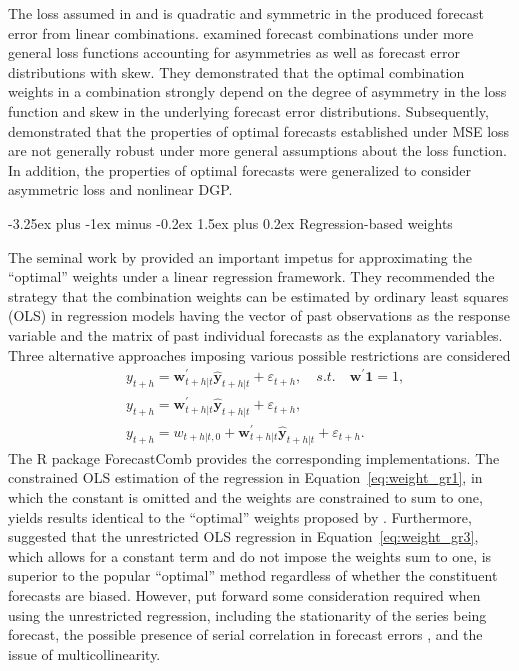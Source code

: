\documentclass[11pt]{article}
\makeatletter
\newcommand{\pkg}[1]{{\normalfont\fontseries{b}\selectfont #1}}
\let\proglang=\textsf
\renewcommand{\paragraph}{\@startsection{paragraph}{4}{0ex}%
   {-3.25ex plus -1ex minus -0.2ex}%
   {1.5ex plus 0.2ex}%
   {\normalfont\normalsize\bfseries}}
\makeatother
\begin{document}
The loss assumed in \citet{Bates1969-yj} and \citet{Newbold1974-lp} is quadratic and symmetric in the produced forecast error from linear combinations. \citet{Elliott2004-dz} examined forecast combinations under more general loss functions accounting for asymmetries as well as forecast error distributions with skew. They demonstrated that the optimal combination weights in a combination strongly depend on the degree of asymmetry in the loss function and skew in the underlying forecast error distributions. Subsequently, \citet{Patton2007-zo} demonstrated that the properties of optimal forecasts established under MSE loss are not generally robust under more general assumptions about the loss function. In addition, the properties of optimal forecasts were generalized to consider asymmetric loss and nonlinear DGP.

\paragraph{Regression-based weights}

The seminal work by \citet{Granger1984-jc} provided an important impetus for approximating the ``optimal'' weights under a linear regression framework. They recommended the strategy that the combination weights can be estimated by ordinary least squares (OLS) in regression models having the vector of past observations as the response variable and the matrix of past individual forecasts as the explanatory variables. Three alternative approaches imposing various possible restrictions are considered
\begin{align}
&y_{t+h}=\boldsymbol{w}_{t+h|t}^{\prime} \hat{\boldsymbol{y}}_{t+h|t}+\varepsilon_{t+h}, \quad s.t. \quad \boldsymbol{w}^{\prime}\boldsymbol{1}=1, \label{eq:weight_gr1}\\
&y_{t+h}=\boldsymbol{w}^{\prime}_{t+h|t} \hat{\boldsymbol{y}}_{t+h|t}+\varepsilon_{t+h}, \nonumber\\
&y_{t+h}=w_{t+h|t, 0}+\boldsymbol{w}_{t+h|t}^{\prime} \hat{\boldsymbol{y}}_{t+h|t}+\varepsilon_{t+h}. \label{eq:weight_gr3}
\end{align}
The \proglang{R} package \pkg{ForecastComb} provides the corresponding implementations. The constrained OLS estimation of the regression in Equation~\eqref{eq:weight_gr1}, in which the constant is omitted and the weights are constrained to sum to one, yields results identical to the ``optimal'' weights proposed by \citet{Bates1969-yj}. Furthermore, \citet{Granger1984-jc} suggested that the unrestricted OLS regression in Equation~\eqref{eq:weight_gr3}, which allows for a constant term and do not impose the weights sum to one, is superior to the popular ``optimal'' method regardless of whether the constituent forecasts are biased. However, \citet{De_Menezes2000-vd} put forward some consideration required when using the unrestricted regression, including the stationarity of the series being forecast, the possible presence of serial correlation in forecast errors \citep[see also][]{Diebold1988-sx,Edward_Coulson1993-db}, and the issue of multicollinearity.
\end{document}
